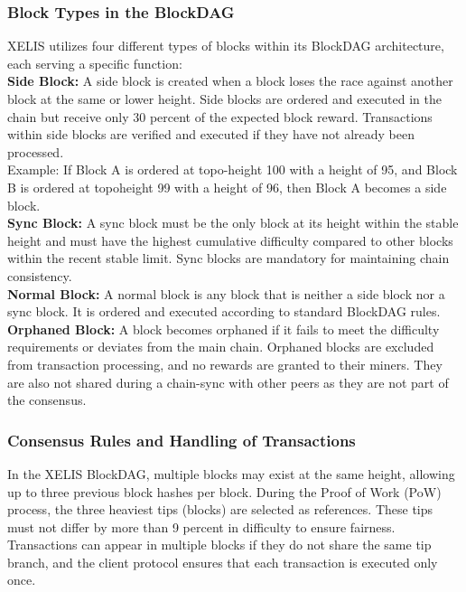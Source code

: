 \documentclass[12pt,a4paper,twocolumn]{article}
\begin{document}
\subsubsection{Block Types in the BlockDAG}

XELIS utilizes four different types of blocks within its BlockDAG architecture, each serving a specific function:\\

\textbf{Side Block:} A side block is created when a block loses the race against another block at the same or lower height. Side blocks are ordered and executed in the chain but receive only 30 percent of the expected block reward. Transactions within side blocks are verified and executed if they have not already been processed.\\

Example:
If Block A is ordered at topo-height 100 with a height of 95, and Block B is ordered at topoheight 99 with a height of 96, then Block A becomes a side block.\\

\textbf{Sync Block:} A sync block must be the only block at its height within the stable height and must have the highest cumulative difficulty compared to other blocks within the recent stable limit. Sync blocks are mandatory for maintaining chain consistency.\\

\textbf{Normal Block:} A normal block is any block that is neither a side block nor a sync block. It is ordered and executed according to standard BlockDAG rules.\\

\textbf{Orphaned Block:} A block becomes orphaned if it fails to meet the difficulty requirements or deviates from the main chain. Orphaned blocks are excluded from transaction processing, and no rewards are granted to their miners. They are also not shared during a chain-sync with other peers as they are not part of the consensus.

\subsubsection{Consensus Rules and Handling of Transactions}

In the XELIS BlockDAG, multiple blocks may exist at the same height, allowing up to three previous block hashes per block. During the Proof of Work (PoW) process, the three heaviest tips (blocks) are selected as references. These tips must not differ by more than 9 percent in difficulty to ensure fairness. Transactions can appear in multiple blocks if they do not share the same tip branch, and the client protocol ensures that each transaction is executed only once.\\
\end{document}
